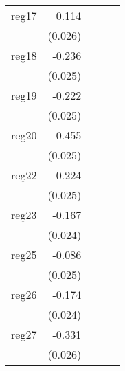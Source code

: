 {\begin{longtable}{l*{4}{D{.}{.}{-1}}}
\addlinespace
reg17       &       0.114\sym{***}&                     &                     &                     \\
            &     (0.026)         &                     &                     &                     \\
\addlinespace
reg18       &      -0.236\sym{***}&                     &                     &                     \\
            &     (0.025)         &                     &                     &                     \\
\addlinespace
reg19       &      -0.222\sym{***}&                     &                     &                     \\
            &     (0.025)         &                     &                     &                     \\
\addlinespace
reg20       &       0.455\sym{***}&                     &                     &                     \\
            &     (0.025)         &                     &                     &                     \\
\addlinespace
reg22       &      -0.224\sym{***}&                     &                     &                     \\
            &     (0.025)         &                     &                     &                     \\
\addlinespace
reg23       &      -0.167\sym{***}&                     &                     &                     \\
            &     (0.024)         &                     &                     &                     \\
\addlinespace
reg25       &      -0.086\sym{***}&                     &                     &                     \\
            &     (0.025)         &                     &                     &                     \\
\addlinespace
reg26       &      -0.174\sym{***}&                     &                     &                     \\
            &     (0.024)         &                     &                     &                     \\
\addlinespace
reg27       &      -0.331\sym{***}&                     &                     &                     \\
            &     (0.026)         &                     &                     &                     \\

\end{longtable}}

